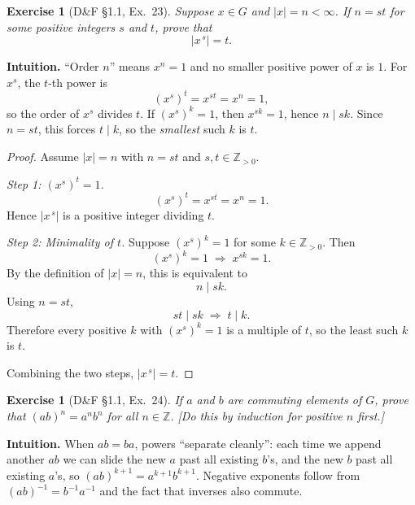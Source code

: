 \documentclass[12pt]{article}
\newtheorem{exercise}[theorem]{Exercise}
\theoremstyle{definition}
\begin{document}
\newpage

\begin{exercise}[D\&F §1.1, Ex.~23]
Suppose $x\in G$ and $|x|=n<\infty$. If $n=st$ for some positive integers $s$ and $t$, prove that
\[
\bigl|x^{\,s}\bigr|=t.
\]
\end{exercise}

\dotfill

\noindent
\textbf{Intuition.}
“Order $n$” means $x^n=1$ and no smaller positive power of $x$ is $1$.
For $x^s$, the $t$-th power is
\[
(x^s)^t=x^{st}=x^n=1,
\]
so the order of $x^s$ divides $t$. If $(x^s)^k=1$, then $x^{sk}=1$, hence $n\mid sk$.
Since $n=st$, this forces $t\mid k$, so the \emph{smallest} such $k$ is $t$.

\dotfill

\begin{proof}
Assume $|x|=n$ with $n=st$ and $s,t\in\mathbb{Z}_{>0}$.

\noindent\emph{Step 1: $(x^s)^t=1$.}
\[
(x^s)^t=x^{st}=x^{n}=1.
\]
Hence $\bigl|x^{\,s}\bigr|$ is a positive integer dividing $t$.

\dotfill

\noindent\emph{Step 2: Minimality of $t$.}
Suppose $(x^s)^k=1$ for some $k\in\mathbb{Z}_{>0}$. Then
\[
(x^s)^k=1 \;\Longrightarrow\; x^{sk}=1.
\]
By the definition of $|x|=n$, this is equivalent to
\[
n\mid sk.
\]
Using $n=st$,
\[
st \mid sk \;\Longrightarrow\; t \mid k.
\]
Therefore every positive $k$ with $(x^s)^k=1$ is a multiple of $t$, so the least such $k$ is $t$.

\dotfill

Combining the two steps, $\bigl|x^{\,s}\bigr|=t$.
\end{proof}

\newpage

\begin{exercise}[D\&F §1.1, Ex.~24]
If $a$ and $b$ are commuting elements of $G$, prove that $(ab)^n=a^n b^n$ for all $n\in\mathbb{Z}$. 
[Do this by induction for positive $n$ first.]
\end{exercise}

\dotfill

\noindent
\textbf{Intuition.}
When $ab=ba$, powers “separate cleanly”: each time we append another $ab$ we can slide the new $a$
past all existing $b$’s, and the new $b$ past all existing $a$’s, so $(ab)^{k+1}=a^{k+1}b^{k+1}$. 
Negative exponents follow from $(ab)^{-1}=b^{-1}a^{-1}$ and the fact that inverses also commute.
\end{document}
